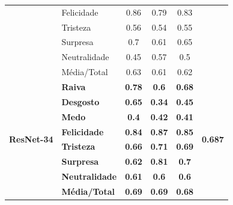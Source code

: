 \begin{table}[]
\begin{tabular}{llcccc}
                                       & Felicidade            & 0.86              & 0.79               & 0.83              &                                 \\
                                       & Tristeza              & 0.56              & 0.54               & 0.55              &                                 \\
                                       & Surpresa              & 0.7               & 0.61               & 0.65              &                                 \\
                                       & Neutralidade          & 0.45              & 0.57               & 0.5               &                                 \\
                                       & Média/Total           & 0.63              & 0.61               & 0.62              &                                 \\ \hline
\multirow{8}{*}{\textbf{ResNet-34}} & \textbf{Raiva}        & \textbf{0.78}     & \textbf{0.6}       & \textbf{0.68}     & \multirow{8}{*}{\textbf{0.687}} \\
                                       & \textbf{Desgosto}     & \textbf{0.65}     & \textbf{0.34}      & \textbf{0.45}     &                                 \\
                                       & \textbf{Medo}         & \textbf{0.4}      & \textbf{0.42}      & \textbf{0.41}     &                                 \\
                                       & \textbf{Felicidade}   & \textbf{0.84}     & \textbf{0.87}      & \textbf{0.85}     &                                 \\
                                       & \textbf{Tristeza}     & \textbf{0.66}     & \textbf{0.71}      & \textbf{0.69}     &                                 \\
                                       & \textbf{Surpresa}     & \textbf{0.62}     & \textbf{0.81}      & \textbf{0.7}      &                                 \\
                                       & \textbf{Neutralidade} & \textbf{0.61}     & \textbf{0.6}       & \textbf{0.6}      &                                 \\
                                       & \textbf{Média/Total}  & \textbf{0.69}     & \textbf{0.69}      & \textbf{0.68}     &                                 \\ \hline
\end{tabular}
\end{table}



